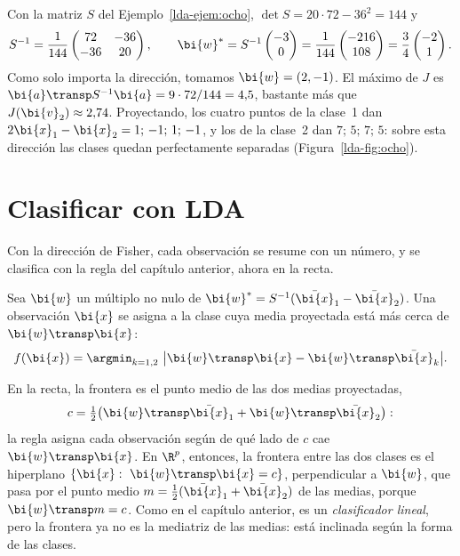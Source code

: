 \begin{example}\label{lda-ejem:ocho-fisher}
Con la matriz $S$ del Ejemplo~\ref{lda-ejem:ocho},
$\det S=20\cdot72-36^2=144$ y
\[
S^{-1}=\frac1{144}\begin{pmatrix}72&-36\\-36&20\end{pmatrix},\qquad
\bi{w}^\ast=S^{-1}\begin{pmatrix}-3\\0\end{pmatrix}=\frac1{144}\begin{pmatrix}-216\\108\end{pmatrix}
=\frac34\begin{pmatrix}-2\\1\end{pmatrix}.
\]
Como solo importa la dirección, tomamos $\bi{w}=(2,-1)$. El máximo de $J$ es
$\bi{a}\transp S^{-1}\bi{a}=9\cdot72/144=4{,}5$, bastante más que $J(\bi{v}_2)\approx2{,}74$.
Proyectando, los cuatro puntos de la clase~1 dan $2\bi{x}_1-\bi{x}_2=1;\,-1;\,1;\,-1$, y
los de la clase~2 dan $7;\,5;\,7;\,5$: sobre esta dirección las clases quedan
perfectamente separadas (Figura~\ref{lda-fig:ocho}).
\end{example}

\section{Clasificar con LDA}\label{lda-sec:clasificar}

Con la dirección de Fisher, cada observación se resume con un número, y se
clasifica con la regla del capítulo anterior, ahora en la recta.

\begin{definition}\label{lda-def:regla-dos}
Sea $\bi{w}$ un múltiplo no nulo de $\bi{w}^\ast=S^{-1}(\bar{\bi{x}}_1-\bar{\bi{x}}_2)$. Una
observación $\bi{x}$ se asigna a la clase cuya media proyectada está más cerca de
$\bi{w}\transp \bi{x}$:
\[
f(\bi{x})=\argmin_{k=1,2}\ \bigl|\bi{w}\transp \bi{x}-\bi{w}\transp\bar{\bi{x}}_k\bigr| .
\]
\end{definition}

En la recta, la frontera es el punto medio de las dos medias proyectadas,
\[
c=\tfrac12\bigl(\bi{w}\transp\bar{\bi{x}}_1+\bi{w}\transp\bar{\bi{x}}_2\bigr):
\]
la regla asigna cada observación según de qué lado de $c$ cae $\bi{w}\transp \bi{x}$. En
$\R^p$, entonces, la frontera entre las dos clases es el hiperplano
$\{\bi{x}:\ \bi{w}\transp \bi{x}=c\}$, perpendicular a $\bi{w}$, que pasa por el punto medio
$m=\frac12(\bar{\bi{x}}_1+\bar{\bi{x}}_2)$ de las medias, porque $\bi{w}\transp m=c$. Como en el
capítulo anterior, es un \emph{clasificador lineal}, pero la frontera ya no es
la mediatriz de las medias: está inclinada según la forma de las clases.

